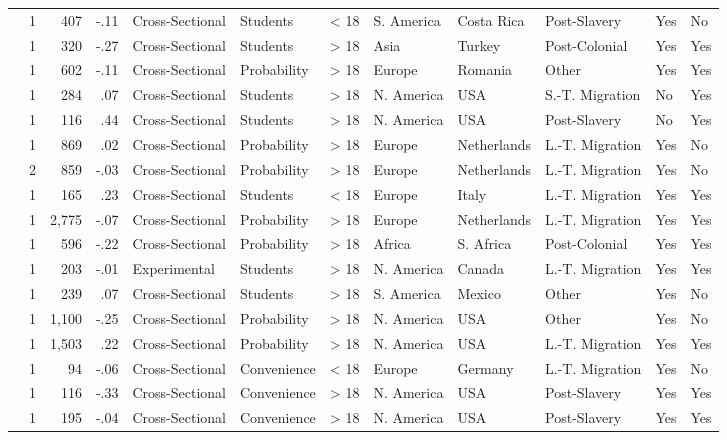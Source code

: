 \documentclass[10pt, letterpaper]{article}
\begin{document}
\begin{landscape}
\begin{xltabular}{650pt}{Xrrrllrlllll}
\cite{480} & 1 & 407 & -.11 & Cross-Sectional & Students & < 18 & S. America & Costa Rica & Post-Slavery & Yes & No\\
\cite{1614} & 1 & 320 & -.27 & Cross-Sectional & Students & > 18 & Asia & Turkey & Post-Colonial & Yes & Yes\\
\cite{3205} & 1 & 602 & -.11 & Cross-Sectional & Probability & > 18 & Europe & Romania & Other & Yes & Yes\\
\cite{91} & 1 & 284 & .07 & Cross-Sectional & Students & > 18 & N. America & USA & S.-T. Migration & No & Yes\\
\cite{1163} & 1 & 116 & .44 & Cross-Sectional & Students & > 18 & N. America & USA & Post-Slavery & No & Yes\\
\cite{783} & 1 & 869 & .02 & Cross-Sectional & Probability & > 18 & Europe & Netherlands & L.-T. Migration & Yes & No\\
 & 2 & 859 & -.03 & Cross-Sectional & Probability & > 18 & Europe & Netherlands & L.-T. Migration & Yes & No\\
\cite{3196} & 1 & 165 & .23 & Cross-Sectional & Students & < 18 & Europe & Italy & L.-T. Migration & Yes & Yes\\
\cite{1807} & 1 & 2,775 & -.07 & Cross-Sectional & Probability & > 18 & Europe & Netherlands & L.-T. Migration & Yes & Yes\\
\cite{336} & 1 & 596 & -.22 & Cross-Sectional & Probability & > 18 & Africa & S. Africa & Post-Colonial & Yes & Yes\\
\cite{2033} & 1 & 203 & -.01 & Experimental & Students & > 18 & N. America & Canada & L.-T. Migration & Yes & Yes\\
\cite{4001} & 1 & 239 & .07 & Cross-Sectional & Students & > 18 & S. America & Mexico & Other & Yes & No\\
\cite{325} & 1 & 1,100 & -.25 & Cross-Sectional & Probability & > 18 & N. America & USA & Other & Yes & No\\
\cite{1576} & 1 & 1,503 & .22 & Cross-Sectional & Probability & > 18 & N. America & USA & L.-T. Migration & Yes & Yes\\
\cite{1949} & 1 & 94 & -.06 & Cross-Sectional & Convenience & < 18 & Europe & Germany & L.-T. Migration & Yes & No\\
\cite{4003} & 1 & 116 & -.33 & Cross-Sectional & Convenience & > 18 & N. America & USA & Post-Slavery & Yes & Yes\\
\cite{2309} & 1 & 195 & -.04 & Cross-Sectional & Convenience & > 18 & N. America & USA & Post-Slavery & Yes & Yes\\

\end{xltabular}
\end{landscape}
\end{document}

